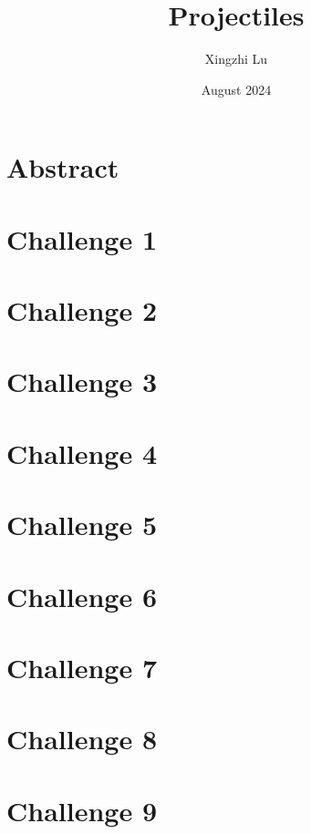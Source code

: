 \documentclass[12pt,a4paper]{article}
\title{Projectiles}
\author{Xingzhi Lu}
\date{August 2024}
\begin{document}
    \maketitle
    \begin{multicols}{2}
        \section*{Abstract}
        \blindtext


        \section{Challenge 1}
        \blindtext


        \section{Challenge 2}
        \blindtext
        


        \section{Challenge 3}
        \blindtext


        \section{Challenge 4}


        \section{Challenge 5}


        \section{Challenge 6}


        \section{Challenge 7}


        \section{Challenge 8}


        \section{Challenge 9}

    \end{multicols}
\end{document}
